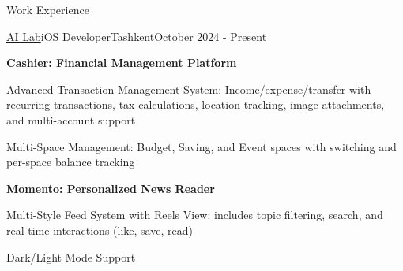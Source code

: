 \begin{resume_section}{Work Experience}
\begin{resume_employer}{\href{https://www.linkedin.com/company/ai-lab-centralasian}{AI Lab}}{iOS Developer}{Tashkent}{October 2024 - Present}
\vspace{\projectspacing}

\textbf{Cashier: Financial Management Platform}
\item Advanced Transaction Management System: Income/expense/transfer with recurring transactions, tax \filbreak calculations, location tracking, image attachments, and multi-account support
\item Multi-Space Management: Budget, Saving, and Event spaces with switching and per-space balance tracking

\vspace{\projectspacing}

\textbf{Momento: Personalized News Reader}
\item Multi-Style Feed System with Reels View: includes topic filtering, search, and real-time interactions (like, save, read)
\item Dark/Light Mode Support 
\end{resume_employer}




\end{resume_section}
